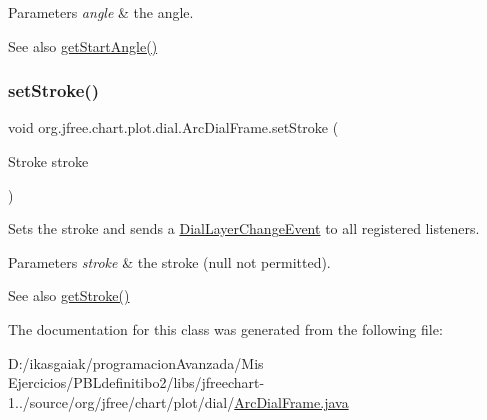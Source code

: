 \begin{DoxyParams}{Parameters}
{\em angle} & the angle.\\
\hline
\end{DoxyParams}
\begin{DoxySeeAlso}{See also}
\mbox{\hyperlink{classorg_1_1jfree_1_1chart_1_1plot_1_1dial_1_1_arc_dial_frame_ac58f374c79b5ded1b5c8048d0e5852d8}{get\+Start\+Angle()}} 
\end{DoxySeeAlso}
\mbox{\label{classorg_1_1jfree_1_1chart_1_1plot_1_1dial_1_1_arc_dial_frame_a3b03da2588e0393015a12a9f69d34bb7}} 
\subsubsection{\texorpdfstring{set\+Stroke()}{setStroke()}}
{\footnotesize\ttfamily void org.\+jfree.\+chart.\+plot.\+dial.\+Arc\+Dial\+Frame.\+set\+Stroke (\begin{DoxyParamCaption}\item[{Stroke}]{stroke }\end{DoxyParamCaption})}

Sets the stroke and sends a \mbox{\hyperlink{classorg_1_1jfree_1_1chart_1_1plot_1_1dial_1_1_dial_layer_change_event}{Dial\+Layer\+Change\+Event}} to all registered listeners.


\begin{DoxyParams}{Parameters}
{\em stroke} & the stroke ({\ttfamily null} not permitted).\\
\hline
\end{DoxyParams}
\begin{DoxySeeAlso}{See also}
\mbox{\hyperlink{classorg_1_1jfree_1_1chart_1_1plot_1_1dial_1_1_arc_dial_frame_af33103b26b734123d651717a5e6068e3}{get\+Stroke()}} 
\end{DoxySeeAlso}


The documentation for this class was generated from the following file\+:\begin{DoxyCompactItemize}
\item 
D\+:/ikasgaiak/programacion\+Avanzada/\+Mis Ejercicios/\+P\+B\+Ldefinitibo2/libs/jfreechart-\/1../source/org/jfree/chart/plot/dial/\mbox{\hyperlink{_arc_dial_frame_8java}{Arc\+Dial\+Frame.\+java}}\end{DoxyCompactItemize}
